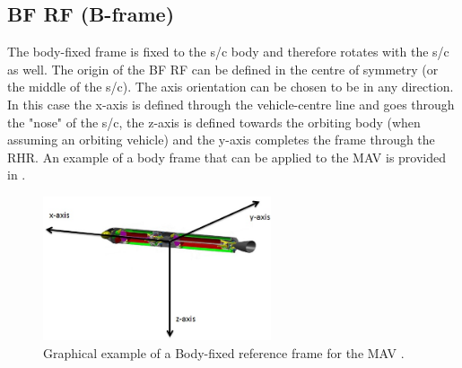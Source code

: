
\subsection{\acl{BF} \ac{RF} (B-frame)}
\label{subsec:BF}
The body-fixed  frame is fixed to the \ac{s/c} body and therefore rotates with the \ac{s/c} as well. The origin of the \ac{BF} \ac{RF} can be defined in the centre of symmetry (or the middle of the \ac{s/c}). The axis orientation can be chosen to be in any direction. In this case the x-axis is defined through the vehicle-centre line and goes through the "nose" of the \ac{s/c}, the z-axis is defined towards the orbiting body (when assuming an orbiting vehicle) and the y-axis completes the frame through the \ac{RHR}. An example of a body frame that can be applied to the \ac{MAV} is provided in . 


 


\begin{figure}[!ht]
\centering
\includegraphics[width=0.6\textwidth]{figures/reference_frames/baseline_liquid_trinidad2012_bframe.jpg}
\caption{Graphical example of a Body-fixed reference frame for the \ac{MAV} \citep{trinidad2012}.}
\label{fig:baseline_liquid_trinidad2012_bframe}
\end{figure}


